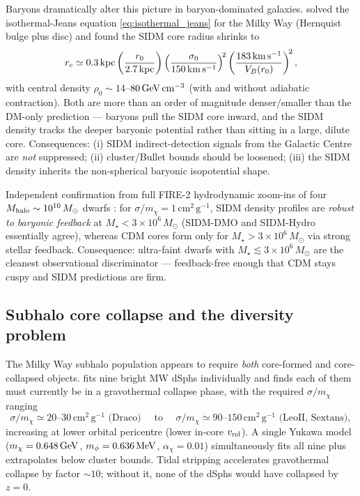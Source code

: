 \documentclass[12pt]{article}
\newcommand{\cmg}{\,\mathrm{cm^2\,g^{-1}}}
\newcommand{\kms}{\,\mathrm{km\,s^{-1}}}
\newcommand{\Msun}{\,M_\odot}
\newcommand{\smx}{\sigma/m_\chi}
\newcommand{\vrel}{v_{\rm rel}}
\begin{document}
Baryons dramatically alter this picture in baryon-dominated galaxies.
\citet{Kaplinghat2014} solved the isothermal-Jeans equation
\eqref{eq:isothermal_jeans} for the Milky Way (Hernquist bulge plus
disc) and found the SIDM core radius shrinks to
%
\begin{equation}
  r_c \simeq 0.3\,{\rm kpc}
    \left(\frac{r_0}{2.7\,{\rm kpc}}\right)
    \left(\frac{\sigma_0}{150\kms}\right)^{\!2}
    \left(\frac{183\kms}{V_B(r_0)}\right)^{\!2},
  \label{eq:MW_core}
\end{equation}
%
with central density $\rho_0 \sim 14$--$80\,{\rm GeV\,cm^{-3}}$ (with
and without adiabatic contraction).  Both are more than an order of
magnitude denser/smaller than the DM-only prediction --- baryons pull
the SIDM core inward, and the SIDM density tracks the deeper
baryonic potential rather than sitting in a large, dilute core.
Consequences: (i) SIDM indirect-detection signals from the Galactic
Centre are \emph{not} suppressed; (ii) cluster/Bullet bounds should be
loosened; (iii) the SIDM density inherits the non-spherical baryonic
isopotential shape.

Independent confirmation from full FIRE-2 hydrodynamic zoom-ins of
four $M_{\rm halo}\sim 10^{10}\Msun$ dwarfs \citep{Robles2017}: for
$\smx=1\cmg$, SIDM density profiles are \emph{robust to baryonic
feedback} at $M_\star < 3\times 10^6\Msun$ (SIDM-DMO and SIDM-Hydro
essentially agree), whereas CDM cores form only for
$M_\star > 3\times 10^6\Msun$ via strong stellar feedback.
Consequence: ultra-faint dwarfs with $M_\star \lesssim 3\times
10^6\Msun$ are the cleanest observational discriminator ---
feedback-free enough that CDM stays cuspy and SIDM predictions are
firm.

\subsection{Subhalo core collapse and the diversity problem}
\label{sec:subhalos}

The Milky Way subhalo population appears to require \emph{both}
core-formed and core-collapsed objects.  \citet{Correa2021} fits nine
bright MW dSphs individually and finds each of them must currently be
in a gravothermal collapse phase, with the required $\smx$ ranging
%
\begin{equation}
  \smx \simeq 20\text{--}30\cmg \text{ (Draco)}
    \quad \text{ to } \quad
  \smx \simeq 90\text{--}150\cmg \text{ (LeoII, Sextans)},
\end{equation}
%
increasing at lower orbital pericentre (lower in-core $\vrel$).  A
single Yukawa model ($m_\chi = 0.648\,{\rm GeV}$, $m_\phi =
0.636\,{\rm MeV}$, $\alpha_\chi = 0.01$) simultaneously fits all nine
plus extrapolates below cluster bounds.  Tidal stripping accelerates
gravothermal collapse by factor $\sim 10$; without it, none of the
dSphs would have collapsed by $z=0$.
\end{document}
